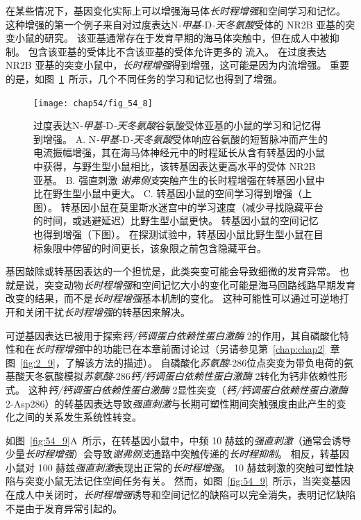 在某些情况下，基因变化实际上可以增强海马体\textit{长时程增强}和空间学习和记忆。
这种增强的第一个例子来自对过度表达N\textit{-甲基-}D\textit{-天冬氨酸}受体的 NR2B 亚基的突变小鼠的研究。
该亚基通常存在于发育早期的海马体突触中，但在成人中被抑制。
包含该亚基的受体比不含该亚基的受体允许更多的  流入。
在过度表达 NR2B 亚基的突变小鼠中，\textit{长时程增强}得到增强，这可能是因为内流增强。
重要的是，如图~\ref{fig:54_8}~所示，几个不同任务的学习和记忆也得到了增强。


\begin{figure}[htbp]
	\centering
	\texttt{[image: chap54/fig\_54\_8]}
	\caption{过度表达N\textit{-甲基-}D\textit{-天冬氨酸}谷氨酸受体亚基的小鼠的学习和记忆得到增强。
		A. N\textit{-甲基-}D\textit{-天冬氨酸}受体响应谷氨酸的短暂脉冲而产生的电流振幅增强，其在海马体神经元中的时程延长从含有转基因的小鼠中获得，与野生型小鼠相比，该转基因表达更高水平的受体 NR2B 亚基。
		B. 强直刺激 \textit{谢弗侧支}突触产生的长时程增强在转基因小鼠中比在野生型小鼠中更大。
		C. 转基因小鼠的空间学习得到增强（上图）。
		转基因小鼠在莫里斯水迷宫中的学习速度（减少寻找隐藏平台的时间，或逃避延迟）比野生型小鼠更快。
		转基因小鼠的空间记忆也得到增强（下图）。
		在探测试验中，转基因小鼠比野生型小鼠在目标象限中停留的时间更长，该象限之前包含隐藏平台。}
	\label{fig:54_8}
\end{figure}


基因敲除或转基因表达的一个担忧是，此类突变可能会导致细微的发育异常。
也就是说，突变动物\textit{长时程增强}和空间记忆大小的变化可能是海马回路线路早期发育改变的结果，而不是\textit{长时程增强}基本机制的变化。
这种可能性可以通过可逆地打开和关闭干扰\textit{长时程增强}的转基因来解决。


可逆基因表达已被用于探索\textit{钙/钙调蛋白依赖性蛋白激酶} 2的作用，其自磷酸化特性和在\textit{长时程增强}中的功能已在本章前面讨论过（另请参见第~\ref{chap:chap2}~章图~\ref{fig:2_9}，了解该方法的描述）。
自磷酸化\textit{苏氨酸}-286位点突变为带负电荷的氨基酸天冬氨酸模拟\textit{苏氨酸}-286\textit{钙/钙调蛋白依赖性蛋白激酶} 2转化为钙非依赖性形式。
这种\textit{钙/钙调蛋白依赖性蛋白激酶} 2显性突变（\textit{钙/钙调蛋白依赖性蛋白激酶} 2-Asp286）的转基因表达导致\textit{强直刺激}与长期可塑性期间突触强度由此产生的变化之间的关系发生系统性转变。


如图~\ref{fig:54_9}A~所示，在转基因小鼠中，中频 10 赫兹的\textit{强直刺激}（通常会诱导少量\textit{长时程增强}）会导致\textit{谢弗侧支}通路中突触传递的\textit{长时程抑制}。
相反，转基因小鼠对 100 赫兹\textit{强直刺激}表现出正常的\textit{长时程增强}。
10 赫兹刺激的突触可塑性缺陷与突变小鼠无法记住空间任务有关。
然而，如图~\ref{fig:54_9}~所示，当突变基因在成人中关闭时，\textit{长时程增强}诱导和空间记忆的缺陷可以完全消失，表明记忆缺陷不是由于发育异常引起的。


